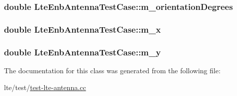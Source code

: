 \subsubsection[{\texorpdfstring{m\+\_\+orientation\+Degrees}{m_orientationDegrees}}]{\setlength{\rightskip}{0pt plus 5cm}double Lte\+Enb\+Antenna\+Test\+Case\+::m\+\_\+orientation\+Degrees\hspace{0.3cm}{\ttfamily [private]}}\hypertarget{classLteEnbAntennaTestCase_a00b3429c0d173fa3fbdc0139fd6b3c75}{}\label{classLteEnbAntennaTestCase_a00b3429c0d173fa3fbdc0139fd6b3c75}
\subsubsection[{\texorpdfstring{m\+\_\+x}{m_x}}]{\setlength{\rightskip}{0pt plus 5cm}double Lte\+Enb\+Antenna\+Test\+Case\+::m\+\_\+x\hspace{0.3cm}{\ttfamily [private]}}\hypertarget{classLteEnbAntennaTestCase_a7637fedb08b5740e33a0675e883fa35e}{}\label{classLteEnbAntennaTestCase_a7637fedb08b5740e33a0675e883fa35e}
\subsubsection[{\texorpdfstring{m\+\_\+y}{m_y}}]{\setlength{\rightskip}{0pt plus 5cm}double Lte\+Enb\+Antenna\+Test\+Case\+::m\+\_\+y\hspace{0.3cm}{\ttfamily [private]}}\hypertarget{classLteEnbAntennaTestCase_a97b29e700065abced8ae92ca354abf4a}{}\label{classLteEnbAntennaTestCase_a97b29e700065abced8ae92ca354abf4a}


The documentation for this class was generated from the following file\+:\begin{DoxyCompactItemize}
\item 
lte/test/\hyperlink{test-lte-antenna_8cc}{test-\/lte-\/antenna.\+cc}\end{DoxyCompactItemize}
